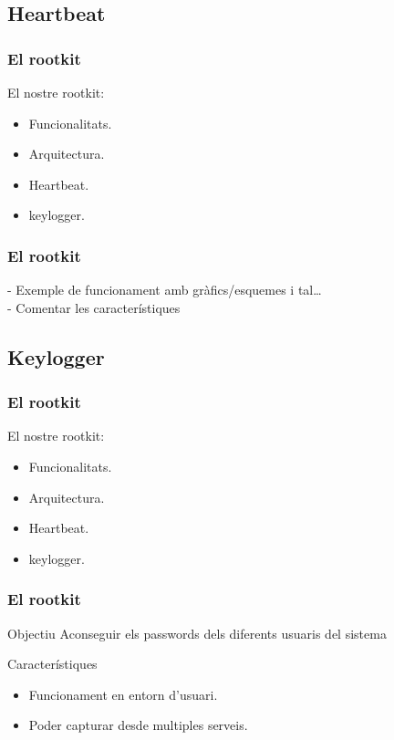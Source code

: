 \documentclass{beamer}
\begin{document}
\subsection{Heartbeat}

\begin{frame}
    \frametitle{El rootkit}
	\begin{block}{El nostre rootkit:}
		\begin{itemize}
			\item Funcionalitats.
			\item Arquitectura.
			\item \alert{Heartbeat.}
			\item keylogger.
		\end{itemize}
	\end{block}
\end{frame}

\begin{frame}
    \frametitle{El rootkit}
      - Exemple de funcionament amb gràfics/esquemes i tal\ldots \\
      - Comentar les característiques
\end{frame}

\subsection{Keylogger}

\begin{frame}
    \frametitle{El rootkit}
	\begin{block}{El nostre rootkit:}
		\begin{itemize}
			\item Funcionalitats.
			\item Arquitectura.
			\item Heartbeat.
			\item \alert{keylogger.}
		\end{itemize}
	\end{block}
\end{frame}

\begin{frame}
	\frametitle{El rootkit}
	\begin{block}{Objectiu}
		Aconseguir els passwords dels diferents usuaris del sistema
	\end{block}
	\begin{block}{Característiques}
		\begin{itemize}
			\item Funcionament en entorn d'usuari.
			\item Poder capturar desde multiples serveis.
		\end{itemize}
	\end{block}
\end{frame}
\end{document}

